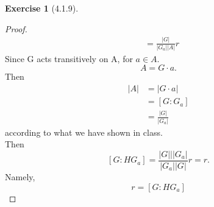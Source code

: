 \documentclass{amsart}
\theoremstyle{plain}
\theoremstyle{definition}
\newtheorem{exer}[lem]{Exercise}
\begin{document}
\begin{exer}[4.1.9]
\begin{enumerate}[(a)]
\begin{proof}
\begin{align*}
  [G:HG_a] &= \frac{|G|}{|G_a||A|}r 
\end{align*}
Since G acts transitively on A, for $a \in A$.
\[A = G\cdot a.\]
Then 
\begin{align*}
 	|A| &= |G\cdot a|\\
  		  &= [G:G_a] \\
  		&= \frac{|G|}{|G_a|}
\end{align*}
according to what we have shown in class.\\
Then 
\[ [G:HG_a] = \frac{|G|||G_a|}{|G_a||G|}r = r.\]
Namely, 
\[ r = [G:HG_a]\]
\end{proof}
\end{enumerate}
\end{exer}
\end{document}

